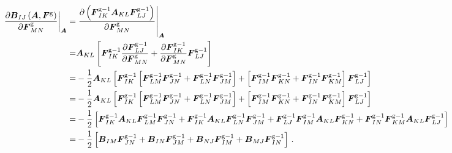 \documentclass[10pt,letterpaper,oneside]{report}
\newcommand{\ten}[1]{\mbox{\boldmath $#1$}{}}
\newcommand{\scas}[1]{\mbox{{\scriptsize{${\rm{#1}}$}}}{}}
\newcommand{\tens}[1]{\mbox{\boldmath{\scriptsize{$#1$}}}{}}
\begin{document}
\begin{align}
\left. \frac{\partial \ten{B}_{IJ} \left(\ten{A}, \ten{F}^{\scas{g}} \right)}{\partial \ten{F}^{\scas{g}}_{MN}} \right|_{\tens{A}} 
=& \left. \frac{\partial \left( \ten{F}^{\scas{g}-1}_{IK} \ten{A}_{KL} \ten{F}^{\scas{g}-1}_{LJ} \right)}{\partial \ten{F}^{\scas{g}}_{MN} } \right|_{\tens{A}} 
\notag \\
=& \ten{A}_{KL} \left[ \ten{F}^{\scas{g}-1}_{IK}  \frac{\partial \ten{F}^{\scas{g}-1}_{LJ} }{\partial \ten{F}^{\scas{g}}_{MN} } + \frac{\partial \ten{F}^{\scas{g}-1}_{IK} }{\partial \ten{F}^{\scas{g}}_{MN} } \ten{F}^{\scas{g}-1}_{LJ} \right]
\notag \\
=& - \frac{1}{2} \ten{A}_{KL} \left[ \ten{F}^{\scas{g}-1}_{IK} \left[ \ten{F}^{\scas{g}-1}_{LM} \ten{F}^{\scas{g}-1}_{JN} + \ten{F}^{\scas{g}-1}_{LN} \ten{F}^{\scas{g}-1}_{JM} \right] + \left[ \ten{F}^{\scas{g}-1}_{IM} \ten{F}^{\scas{g}-1}_{KN} + \ten{F}^{\scas{g}-1}_{IN} \ten{F}^{\scas{g}-1}_{KM} \right] \ten{F}^{\scas{g}-1}_{LJ} \right]
\notag \\
=& - \frac{1}{2} \ten{A}_{KL} \left[ \ten{F}^{\scas{g}-1}_{IK} \left[ \ten{F}^{\scas{g}-1}_{LM} \ten{F}^{\scas{g}-1}_{JN} + \ten{F}^{\scas{g}-1}_{LN} \ten{F}^{\scas{g}-1}_{JM} \right] + \left[ \ten{F}^{\scas{g}-1}_{IM} \ten{F}^{\scas{g}-1}_{KN} + \ten{F}^{\scas{g}-1}_{IN} \ten{F}^{\scas{g}-1}_{KM} \right] \ten{F}^{\scas{g}-1}_{LJ} \right]
\notag \\
=& - \frac{1}{2} \left[ \ten{F}^{\scas{g}-1}_{IK} \ten{A}_{KL} \ten{F}^{\scas{g}-1}_{LM} \ten{F}^{\scas{g}-1}_{JN} + \ten{F}^{\scas{g}-1}_{IK} \ten{A}_{KL} \ten{F}^{\scas{g}-1}_{LN} \ten{F}^{\scas{g}-1}_{JM} + \ten{F}^{\scas{g}-1}_{LJ} \ten{F}^{\scas{g}-1}_{IM} \ten{A}_{KL} \ten{F}^{\scas{g}-1}_{KN} + \ten{F}^{\scas{g}-1}_{IN} \ten{F}^{\scas{g}-1}_{KM} \ten{A}_{KL} \ten{F}^{\scas{g}-1}_{LJ} \right]
\notag \\
=& - \frac{1}{2} \left[ \ten{B}_{IM} \ten{F}^{\scas{g}-1}_{JN} + \ten{B}_{IN} \ten{F}^{\scas{g}-1}_{JM} + \ten{B}_{NJ} \ten{F}^{\scas{g}-1}_{IM} + \ten{B}_{MJ} \ten{F}^{\scas{g}-1}_{IN} \right] \, .
\label{congruenceFg}
\end{align}
\end{document}
